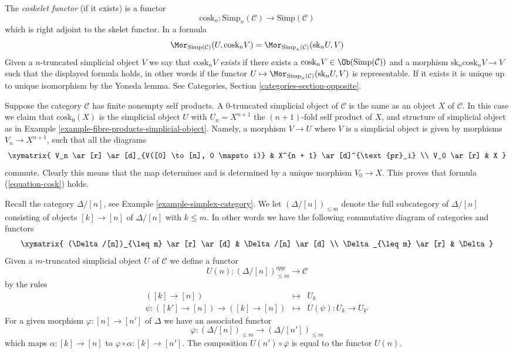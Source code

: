 \medskip\noindent
The {\it coskelet functor} (if it exists) is a functor
$$
\text{cosk}_n :
\text{Simp}_n(\mathcal{C}) \longrightarrow \text{Simp}(\mathcal{C})
$$
which is right adjoint to the skelet functor. In a formula
\begin{equation}
\label{equation-cosk}
\Mor_{\text{Simp}(\mathcal{C})}(U, \text{cosk}_n V)
=
\Mor_{\text{Simp}_n(\mathcal{C})}(\text{sk}_n U, V)
\end{equation}
Given a $n$-truncated simplicial object $V$ we
say that {\it $\text{cosk}_nV$ exists} if there
exists a $\text{cosk}_nV \in \Ob(\text{Simp}(\mathcal{C}))$
and a morphism $\text{sk}_n \text{cosk}_n V \to V$
such that the displayed formula holds, in other words
if the functor
$U \mapsto \Mor_{\text{Simp}_n(\mathcal{C})}(\text{sk}_n U, V)$
is representable. If it exists it
is unique up to unique isomorphism by the Yoneda lemma.
See Categories, Section \ref{categories-section-opposite}.

\begin{example}
\label{example-cosk0}
Suppose the category $\mathcal{C}$ has finite nonempty self products.
A $0$-truncated simplicial object of $\mathcal{C}$ is the same
as an object $X$ of $\mathcal{C}$. In this case
we claim that $\text{cosk}_0(X)$ is the simplicial
object $U$ with $U_n = X^{n + 1}$ the $(n + 1)$-fold self
product of $X$, and structure of simplicial object
as in Example \ref{example-fibre-products-simplicial-object}.
Namely, a morphism $V \to U$ where $V$ is a simplicial
object is given by morphisms $V_n \to X^{n + 1}$, such
that all the diagrams
$$
\xymatrix{
V_n \ar[r] \ar[d]_{V([0] \to [n], 0 \mapsto i)} &
X^{n + 1} \ar[d]^{\text{pr}_i} \\
V_0 \ar[r] &
X
}
$$
commute. Clearly this means that the map determines and is determined
by a unique morphism $V_0 \to X$. This proves that formula
(\ref{equation-cosk}) holds.
\end{example}

\noindent
Recall the category $\Delta/[n]$, see Example \ref{example-simplex-category}.
We let $(\Delta/[n])_{\leq m}$ denote the full subcategory
of $\Delta/[n]$ consisting of objects $[k] \to [n]$
of $\Delta/[n]$ with $k \leq m$. In other words we have
the following commutative diagram of categories and functors
$$
\xymatrix{
(\Delta/[n])_{\leq m} \ar[r] \ar[d] &
\Delta/[n] \ar[d] \\
\Delta_{\leq m} \ar[r] &
\Delta
}
$$
Given a $m$-truncated
simplicial object $U$ of $\mathcal{C}$
we define a functor
$$
U(n) : (\Delta/[n])_{\leq m}^{opp} \longrightarrow \mathcal{C}
$$
by the rules
\begin{eqnarray*}
([k] \to [n]) & \longmapsto & U_k \\
\psi : ([k'] \to [n]) \to ([k] \to [n]) &
\longmapsto &
U(\psi) : U_k \to U_{k'}
\end{eqnarray*}
For a given morphism $\varphi : [n] \to [n']$ of $\Delta$
we have an associated functor
$$
\overline{\varphi} :
(\Delta/[n])_{\leq m}
\longrightarrow
(\Delta/[n'])_{\leq m}
$$
which maps $\alpha : [k] \to [n]$ to
$\varphi \circ \alpha : [k] \to [n']$.
The composition $U(n') \circ \overline{\varphi}$ is
equal to the functor $U(n)$.

